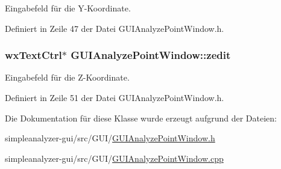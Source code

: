 Eingabefeld für die Y-\/\-Koordinate. 



Definiert in Zeile 47 der Datei G\-U\-I\-Analyze\-Point\-Window.\-h.

\hypertarget{classGUIAnalyzePointWindow_a173e639b35cc6c18a74fb746b8664c8c}{
\subsubsection[{zedit}]{\setlength{\rightskip}{0pt plus 5cm}wx\-Text\-Ctrl$\ast$ G\-U\-I\-Analyze\-Point\-Window\-::zedit\hspace{0.3cm}{\ttfamily [private]}}}\label{classGUIAnalyzePointWindow_a173e639b35cc6c18a74fb746b8664c8c}


Eingabefeld für die Z-\/\-Koordinate. 



Definiert in Zeile 51 der Datei G\-U\-I\-Analyze\-Point\-Window.\-h.



Die Dokumentation für diese Klasse wurde erzeugt aufgrund der Dateien\-:\begin{DoxyCompactItemize}
\item 
simpleanalyzer-\/gui/src/\-G\-U\-I/\hyperlink{GUIAnalyzePointWindow_8h}{G\-U\-I\-Analyze\-Point\-Window.\-h}\item 
simpleanalyzer-\/gui/src/\-G\-U\-I/\hyperlink{GUIAnalyzePointWindow_8cpp}{G\-U\-I\-Analyze\-Point\-Window.\-cpp}\end{DoxyCompactItemize}
